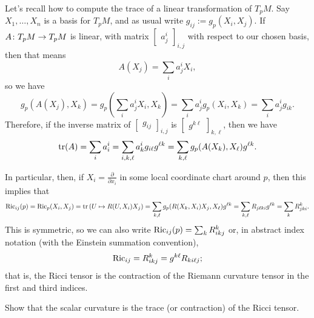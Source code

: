 Let's recall how to compute the trace of a linear transformation of $T_pM$. Say $X_1, \dots , X_n$ is a basis for $T_pM$, and as usual write $g_{ij} := g_p( X_i, X_j)$. If $A \colon\thinspace\! T_pM \to T_pM$ is linear, with matrix $\begin{bmatrix}a_j^i\end{bmatrix}_{i,j}$ with respect to our chosen basis, then that means
\[
	A(X_j) = \sum_i a_j^i X_i,
\]
so we have
\[
	g_p(A(X_j),X_k) = g_p\left(\sum_i a_j^iX_i, X_k\right) = \sum_i a_j^i g_p(X_i,X_k) = \sum_i a_j^i g_{ik}.
\]
Therefore, if the inverse matrix of $\begin{bmatrix}g_{ij}\end{bmatrix}_{i,j}$ is $\begin{bmatrix}g^{k\ell}\end{bmatrix}_{k,\ell}$, then we have
\[
	\operatorname{tr}(A) = \sum_i a_i^i = \sum_{i,k,\ell} a_k^i g_{i\ell}g^{\ell k} = \sum_{k,\ell} g_p(A(X_k),X_\ell)g^{\ell k}.
\]

In particular, then, if $X_i = \frac{\partial}{\partial x_i}$ in some local coordinate chart around $p$, then this implies that
\[
	\operatorname{Ric}_{ij}(p) = \operatorname{Ric}_p(X_i,X_j) = \operatorname{tr}\left(U \mapsto R(U,X_i)X_j\right) = \sum_{k,\ell}g_p(R(X_k,X_i)X_j,X_\ell)g^{\ell k} = \sum_{k,\ell} R_{j\ell ki}g^{\ell k} = \sum_k R_{jki}^k.
\]
This is symmetric, so we can also write $\operatorname{Ric}_{ij}(p) = \sum_k R_{ikj}^k$ or, in abstract index notation (with the Einstein summation convention),
\[
	\operatorname{Ric}_{ij} = R_{ikj}^k = g^{k\ell}R_{ki\ell j};
\]
that is, the Ricci tensor is the contraction of the Riemann curvature tensor in the first and third indices.

\begin{exercise}
	Show that the scalar curvature is the trace (or contraction) of the Ricci tensor.
\end{exercise}